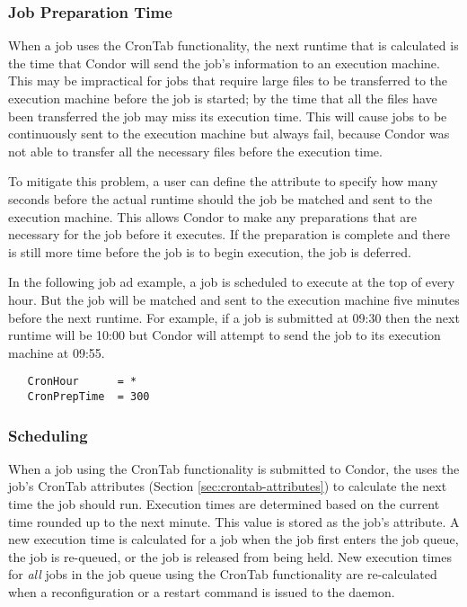 \subsubsection{Job Preparation Time}
\label{sec:crontab-preptime}

When a job uses the CronTab functionality, 
the next runtime that is calculated is
the time that Condor will send the job's information to an execution machine.
This may be impractical for jobs that require large files to be transferred to
the execution machine before the job is started; 
by the time that all the 
files have been transferred the job may miss its execution time. 
This will cause jobs to be continuously sent to the execution machine
but always fail, 
because Condor was not able to transfer all the necessary files 
before the execution time.

To mitigate this problem, 
a user can define the 
attribute to specify how many seconds before the actual runtime should the
job be matched and sent to the execution machine. 
This allows Condor to
make any preparations that are necessary for the job before it executes. 
If the preparation is complete and there is still more time before the job
is to begin execution, the job is deferred.

In the following job ad example, 
a job is scheduled to execute at the top of every hour.
But the job will be matched and sent to the execution machine five minutes
before the next runtime. 
For example, if a job is submitted at 09:30 then the 
next runtime will be 10:00 but Condor will attempt to send the job to
its execution machine at 09:55.

\begin{verbatim}
   CronHour      = *
   CronPrepTime  = 300
\end{verbatim}

\subsubsection{Scheduling}
\label{sec:crontab-scheduling}

When a job using the CronTab functionality is submitted to Condor, 
the  uses the job's CronTab attributes 
(Section \ref{sec:crontab-attributes}) 
to calculate the next time the job should run. 
Execution times are determined based on the current time 
rounded up to the next minute. 
This value is stored as the job's  attribute. 
A new execution time is calculated for a job when the job 
first enters the job queue, 
the job is re-queued, or the job is released from being held. 
New execution times for \emph{all} jobs in the job queue 
using the CronTab functionality are re-calculated 
when a reconfiguration or a restart command is issued to the
 daemon.

